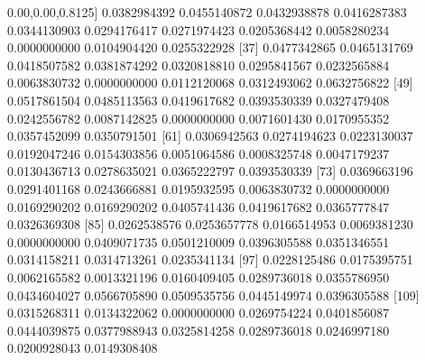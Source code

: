 \documentclass[10pt,]{krantz}
\makeatletter
\newenvironment{Shaded}{\begin{snugshade}}{\end{snugshade}}
\newcommand{\DecValTok}[1]{\textcolor[rgb]{0.00,0.00,0.81}{#1}}
\newcommand{\FloatTok}[1]{\textcolor[rgb]{0.00,0.00,0.81}{#1}}
\newcommand{\NormalTok}[1]{#1}
\newenvironment{kframe}{%
\medskip{}
\setlength{\fboxsep}{.8em}
 \def\at@end@of@kframe{}%
 \ifinner\ifhmode%
  \def\at@end@of@kframe{\end{minipage}}%
  \begin{minipage}{\columnwidth}%
 \fi\fi%
 \def\FrameCommand##1{\hskip\@totalleftmargin \hskip-\fboxsep
 \colorbox{shadecolor}{##1}\hskip-\fboxsep
     \hskip-\linewidth \hskip-\@totalleftmargin \hskip\columnwidth}%
 \MakeFramed {\advance\hsize-\width
   \@totalleftmargin\z@ \linewidth\hsize
   \@setminipage}}%
 {\par\unskip\endMakeFramed%
 \at@end@of@kframe}
\renewenvironment{Shaded}{\begin{kframe}}{\end{kframe}}
\theoremstyle{definition}
\theoremstyle{definition}
\theoremstyle{remark}
\makeatother
\begin{document}
\begin{Shaded}
\begin{Highlighting}[]
\NormalTok{ [}\DecValTok{25}\NormalTok{] }\FloatTok{0.0382984392} \FloatTok{0.0455140872} \FloatTok{0.0432938878} \FloatTok{0.0416287383} \FloatTok{0.0344130903} \FloatTok{0.0294176417} \FloatTok{0.0271974423} \FloatTok{0.0205368442} \FloatTok{0.0058280234} \FloatTok{0.0000000000} \FloatTok{0.0104904420} \FloatTok{0.0255322928}
\NormalTok{ [}\DecValTok{37}\NormalTok{] }\FloatTok{0.0477342865} \FloatTok{0.0465131769} \FloatTok{0.0418507582} \FloatTok{0.0381874292} \FloatTok{0.0320818810} \FloatTok{0.0295841567} \FloatTok{0.0232565884} \FloatTok{0.0063830732} \FloatTok{0.0000000000} \FloatTok{0.0112120068} \FloatTok{0.0312493062} \FloatTok{0.0632756822}
\NormalTok{ [}\DecValTok{49}\NormalTok{] }\FloatTok{0.0517861504} \FloatTok{0.0485113563} \FloatTok{0.0419617682} \FloatTok{0.0393530339} \FloatTok{0.0327479408} \FloatTok{0.0242556782} \FloatTok{0.0087142825} \FloatTok{0.0000000000} \FloatTok{0.0071601430} \FloatTok{0.0170955352} \FloatTok{0.0357452099} \FloatTok{0.0350791501}
\NormalTok{ [}\DecValTok{61}\NormalTok{] }\FloatTok{0.0306942563} \FloatTok{0.0274194623} \FloatTok{0.0223130037} \FloatTok{0.0192047246} \FloatTok{0.0154303856} \FloatTok{0.0051064586} \FloatTok{0.0008325748} \FloatTok{0.0047179237} \FloatTok{0.0130436713} \FloatTok{0.0278635021} \FloatTok{0.0365222797} \FloatTok{0.0393530339}
\NormalTok{ [}\DecValTok{73}\NormalTok{] }\FloatTok{0.0369663196} \FloatTok{0.0291401168} \FloatTok{0.0243666881} \FloatTok{0.0195932595} \FloatTok{0.0063830732} \FloatTok{0.0000000000} \FloatTok{0.0169290202} \FloatTok{0.0169290202} \FloatTok{0.0405741436} \FloatTok{0.0419617682} \FloatTok{0.0365777847} \FloatTok{0.0326369308}
\NormalTok{ [}\DecValTok{85}\NormalTok{] }\FloatTok{0.0262538576} \FloatTok{0.0253657778} \FloatTok{0.0166514953} \FloatTok{0.0069381230} \FloatTok{0.0000000000} \FloatTok{0.0409071735} \FloatTok{0.0501210009} \FloatTok{0.0396305588} \FloatTok{0.0351346551} \FloatTok{0.0314158211} \FloatTok{0.0314713261} \FloatTok{0.0235341134}
\NormalTok{ [}\DecValTok{97}\NormalTok{] }\FloatTok{0.0228125486} \FloatTok{0.0175395751} \FloatTok{0.0062165582} \FloatTok{0.0013321196} \FloatTok{0.0160409405} \FloatTok{0.0289736018} \FloatTok{0.0355786950} \FloatTok{0.0434604027} \FloatTok{0.0566705890} \FloatTok{0.0509535756} \FloatTok{0.0445149974} \FloatTok{0.0396305588}
\NormalTok{[}\DecValTok{109}\NormalTok{] }\FloatTok{0.0315268311} \FloatTok{0.0134322062} \FloatTok{0.0000000000} \FloatTok{0.0269754224} \FloatTok{0.0401856087} \FloatTok{0.0444039875} \FloatTok{0.0377988943} \FloatTok{0.0325814258} \FloatTok{0.0289736018} \FloatTok{0.0246997180} \FloatTok{0.0200928043} \FloatTok{0.0149308408}

\end{Highlighting}
\end{Shaded}
\end{document}
